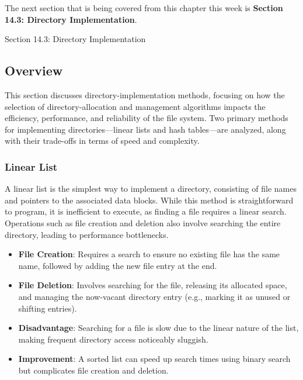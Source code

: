 The next section that is being covered from this chapter this week is \textbf{Section 14.3: Directory Implementation}.

\begin{notes}{Section 14.3: Directory Implementation}
    \subsection*{Overview}

    This section discusses directory-implementation methods, focusing on how the selection of directory-allocation and management algorithms impacts the efficiency, performance, and reliability of the 
    file system. Two primary methods for implementing directories—linear lists and hash tables—are analyzed, along with their trade-offs in terms of speed and complexity.
    
    \subsubsection*{Linear List}
    
    A linear list is the simplest way to implement a directory, consisting of file names and pointers to the associated data blocks. While this method is straightforward to program, it is inefficient 
    to execute, as finding a file requires a linear search. Operations such as file creation and deletion also involve searching the entire directory, leading to performance bottlenecks.
    
    \begin{highlight}
    
        \begin{itemize}
            \item \textbf{File Creation}: Requires a search to ensure no existing file has the same name, followed by adding the new file entry at the end.
            \item \textbf{File Deletion}: Involves searching for the file, releasing its allocated space, and managing the now-vacant directory entry (e.g., marking it as unused or shifting entries).
            \item \textbf{Disadvantage}: Searching for a file is slow due to the linear nature of the list, making frequent directory access noticeably sluggish.
            \item \textbf{Improvement}: A sorted list can speed up search times using binary search but complicates file creation and deletion.
        \end{itemize}
    

\end{highlight}
\end{notes}
